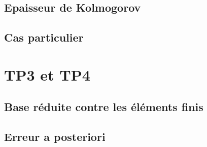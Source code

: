 \documentclass[12pt,a4paper,article]{memoir} %
\begin{document}
\subsection{Epaisseur de Kolmogorov}
\subsection{Cas particulier}

\newpage

\section{TP3 et TP4}
\subsection{Base réduite contre les éléments finis}
\subsection{Erreur a posteriori}
\end{document}

